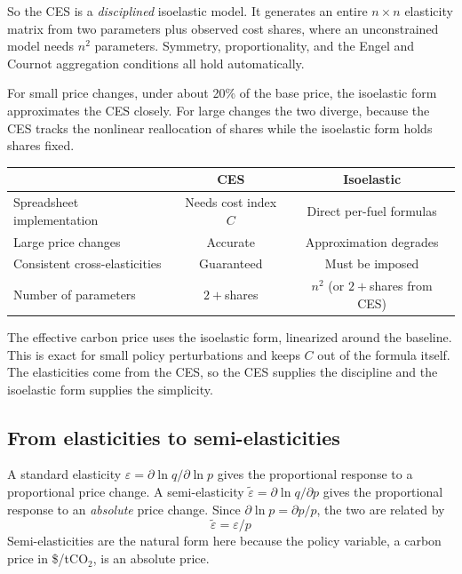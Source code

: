 \documentclass[11pt,a4paper]{article}
\begin{document}
So the CES is a \emph{disciplined} isoelastic model. It generates an entire $n\times n$ elasticity matrix from two parameters plus observed cost shares, where an unconstrained model needs $n^2$ parameters. Symmetry, proportionality, and the Engel and Cournot aggregation conditions all hold automatically.

For small price changes, under about 20\% of the base price, the isoelastic form approximates the CES closely. For large changes the two diverge, because the CES tracks the nonlinear reallocation of shares while the isoelastic form holds shares fixed.

\begin{center}
\renewcommand{\arraystretch}{1.25}
\begin{tabular}{lcc}
\toprule
& \textbf{CES} & \textbf{Isoelastic} \\
\midrule
Spreadsheet implementation & Needs cost index $C$ & Direct per-fuel formulas \\
Large price changes & Accurate & Approximation degrades \\
Consistent cross-elasticities & Guaranteed & Must be imposed \\
Number of parameters & $2+{}$shares & $n^2$ (or $2+{}$shares from CES) \\
\bottomrule
\end{tabular}
\end{center}

The effective carbon price uses the isoelastic form, linearized around the baseline. This is exact for small policy perturbations and keeps $C$ out of the formula itself. The elasticities come from the CES, so the CES supplies the discipline and the isoelastic form supplies the simplicity.

\subsection{From elasticities to semi-elasticities}

A standard elasticity $\varepsilon = \partial\ln q/\partial\ln p$ gives the proportional response to a proportional price change. A semi-elasticity $\tilde{\varepsilon} = \partial\ln q/\partial p$ gives the proportional response to an \emph{absolute} price change. Since $\partial\ln p = \partial p/p$, the two are related by
\begin{equation}\label{eq:semi}
\tilde{\varepsilon} = \varepsilon/p
\end{equation}
Semi-elasticities are the natural form here because the policy variable, a carbon price in \$/tCO$_2$, is an absolute price.
\end{document}
